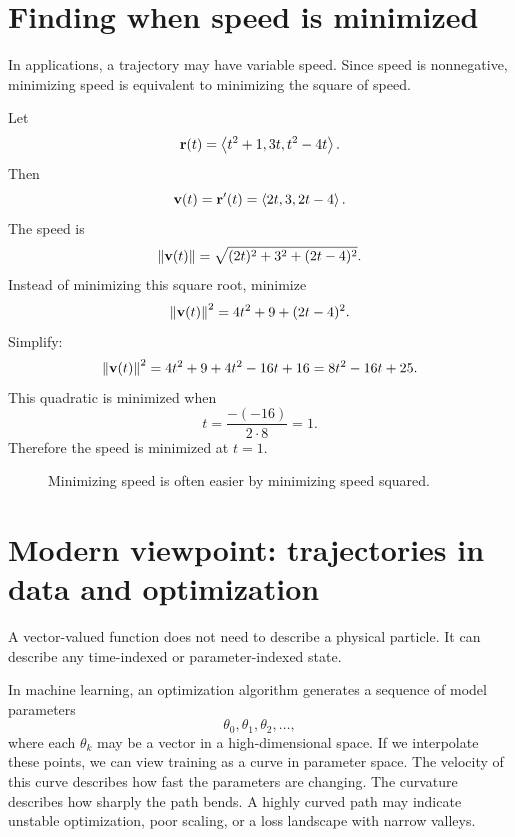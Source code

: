 \section{Finding when speed is minimized}

In applications, a trajectory may have variable speed. Since speed is nonnegative, minimizing speed is equivalent to minimizing the square of speed.

\begin{examplebox}[title={Example 5.13: Minimum speed}]
Let
\[
\mathbf r(t)=\left\langle t^2+1,3t,t^2-4t\right\rangle.
\]
Then
\[
\mathbf v(t)=\mathbf r'(t)=\left\langle 2t,3,2t-4\right\rangle.
\]
The speed is
\[
\left\lVert \mathbf v(t)\right\rVert=\sqrt{(2t)^2+3^2+(2t-4)^2}.
\]
Instead of minimizing this square root, minimize
\[
\left\lVert \mathbf v(t)\right\rVert^2=4t^2+9+(2t-4)^2.
\]
Simplify:
\[
\left\lVert \mathbf v(t)\right\rVert^2=4t^2+9+4t^2-16t+16=8t^2-16t+25.
\]
This quadratic is minimized when
\[
t=\frac{-(-16)}{2\cdot 8}=1.
\]
Therefore the speed is minimized at $t=1$.
\end{examplebox}

\begin{figure}[H]
\centering
{}
\caption{Minimizing speed is often easier by minimizing speed squared.}
\label{fig:speed-minimum}
\end{figure}

\section{Modern viewpoint: trajectories in data and optimization}

A vector-valued function does not need to describe a physical particle. It can describe any time-indexed or parameter-indexed state.

\begin{bridgebox}[title={Gradient descent as a curve}]
In machine learning, an optimization algorithm generates a sequence of model parameters
\[
\theta_0,\theta_1,\theta_2,\ldots,
\]
where each $\theta_k$ may be a vector in a high-dimensional space. If we interpolate these points, we can view training as a curve in parameter space. The velocity of this curve describes how fast the parameters are changing. The curvature describes how sharply the path bends. A highly curved path may indicate unstable optimization, poor scaling, or a loss landscape with narrow valleys.
\end{bridgebox}

